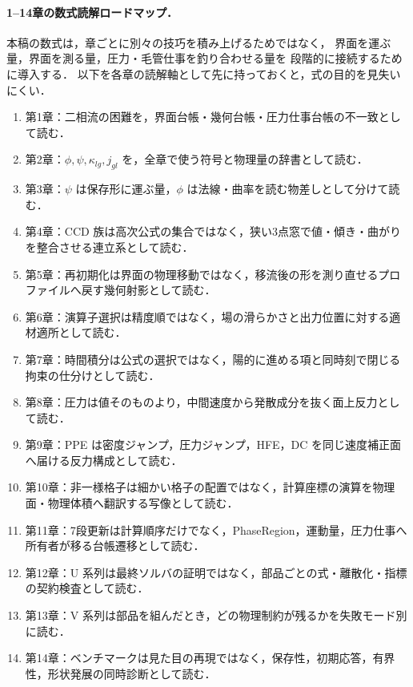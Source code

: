 \paragraph{1--14章の数式読解ロードマップ．}
本稿の数式は，章ごとに別々の技巧を積み上げるためではなく，
界面を運ぶ量，界面を測る量，圧力・毛管仕事を釣り合わせる量を
段階的に接続するために導入する．
以下を各章の読解軸として先に持っておくと，式の目的を見失いにくい．
\begin{enumerate}[leftmargin=2em,itemsep=2pt]
  \item 第1章：二相流の困難を，界面台帳・幾何台帳・圧力仕事台帳の不一致として読む．
  \item 第2章：$\phi,\psi,\kappa_{lg},j_{gl}$ を，全章で使う符号と物理量の辞書として読む．
  \item 第3章：$\psi$ は保存形に運ぶ量，$\phi$ は法線・曲率を読む物差しとして分けて読む．
  \item 第4章：CCD 族は高次公式の集合ではなく，狭い3点窓で値・傾き・曲がりを整合させる連立系として読む．
  \item 第5章：再初期化は界面の物理移動ではなく，移流後の形を測り直せるプロファイルへ戻す幾何射影として読む．
  \item 第6章：演算子選択は精度順ではなく，場の滑らかさと出力位置に対する適材適所として読む．
  \item 第7章：時間積分は公式の選択ではなく，陽的に進める項と同時刻で閉じる拘束の仕分けとして読む．
  \item 第8章：圧力は値そのものより，中間速度から発散成分を抜く面上反力として読む．
  \item 第9章：PPE は密度ジャンプ，圧力ジャンプ，HFE，DC を同じ速度補正面へ届ける反力構成として読む．
  \item 第10章：非一様格子は細かい格子の配置ではなく，計算座標の演算を物理面・物理体積へ翻訳する写像として読む．
  \item 第11章：7段更新は計算順序だけでなく，PhaseRegion，運動量，圧力仕事へ所有者が移る台帳遷移として読む．
  \item 第12章：U 系列は最終ソルバの証明ではなく，部品ごとの式・離散化・指標の契約検査として読む．
  \item 第13章：V 系列は部品を組んだとき，どの物理制約が残るかを失敗モード別に読む．
  \item 第14章：ベンチマークは見た目の再現ではなく，保存性，初期応答，有界性，形状発展の同時診断として読む．
\end{enumerate}

